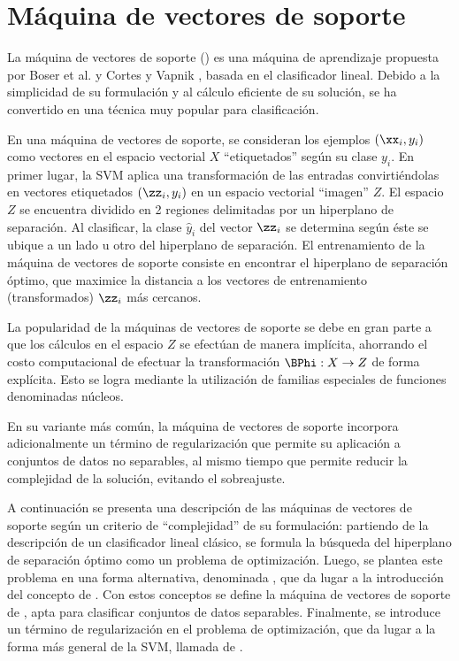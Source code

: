 %
%
%
\section{Máquina de vectores de soporte}
%
La máquina de vectores de soporte ()
es una máquina de aprendizaje propuesta por Boser et al. \cite{boser}
y Cortes y Vapnik \cite{svm}, basada en el clasificador lineal.
Debido a la simplicidad de su formulación y al cálculo eficiente de su
solución, se ha convertido en una técnica muy popular para
clasificación.

En una máquina de vectores de soporte, se consideran los ejemplos
$(\xx_i,y_i)$ como vectores en el espacio vectorial $X$
``etiquetados'' según su clase $y_i$.  En primer lugar, la SVM aplica
una transformación de las entradas convirtiéndolas en vectores
etiquetados $(\zz_i,y_i)$ en un espacio vectorial ``imagen'' $Z$.  El
espacio $Z$ se encuentra dividido en 2 regiones delimitadas por un
hiperplano de separación. Al clasificar, la clase $\hat{y}_i$ del
vector $\zz_i$ se determina según éste se ubique a un lado u otro del
hiperplano de separación.  El entrenamiento de la máquina de vectores
de soporte consiste en encontrar el hiperplano de separación óptimo,
que maximice la distancia a los vectores de entrenamiento
(transformados) $\zz_i$ más cercanos.

La popularidad de la máquinas de vectores de soporte se debe en gran
parte a que los cálculos en el espacio $Z$ se efectúan de manera
implícita, ahorrando el costo computacional de efectuar la
transformación $\BPhi:X\rightarrow{}Z$ de forma explícita. Esto se
logra mediante la utilización de familias especiales de funciones
denominadas núcleos.

En su variante más común, la máquina de vectores de soporte incorpora
adicionalmente un término de regularización que permite su aplicación
a conjuntos de datos no separables, al mismo tiempo que permite
reducir la complejidad de la solución, evitando el sobreajuste.

A continuación se presenta una descripción de las máquinas de
vectores de soporte según un criterio de ``complejidad'' de su
formulación: partiendo de la descripción de un clasificador lineal
clásico, se formula la búsqueda del hiperplano de separación óptimo
como un problema de optimización.  Luego, se plantea este problema en
una forma alternativa, denominada , que da lugar a la
introducción del concepto de . Con estos conceptos se define
la máquina de vectores de soporte de , apta para
clasificar conjuntos de datos separables. Finalmente, se introduce un
término de regularización en el problema de optimización, que da lugar
a la forma más general de la SVM, llamada de .

